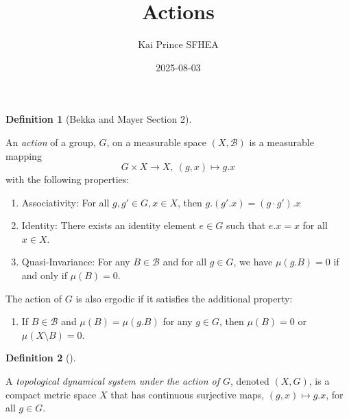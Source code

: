 \documentclass[
  british,
]{article}
\title{Actions}
\author{Kai Prince SFHEA}
\date{2025-08-03}
\providecommand{\tightlist}{%
  \setlength{\itemsep}{0pt}\setlength{\parskip}{0pt}}
\renewcommand*\contentsname{Table of contents}
\newcommand\contentsname{Table of contents}
\theoremstyle{definition}
\newtheorem{definition}{Definition}[section]
\theoremstyle{remark}
\newcommand{\Measure}{{\mu}}
\newcommand{\GroupAction}[2]{{#1}.{#2}}
\newcommand{\GroupIdentity}{{e}}
\newcommand{\Group}{{G}}
\newcommand{\GroupElement}{{g}}
\newcommand{\GroupOperation}[2]{{#1}\cdot{#2}}
\newcommand{\SigmaAlgebra}[1]{{\mathscr{#1}}}
\begin{document}
\maketitle

\renewcommand*\contentsname{Table of contents}
{
\hypersetup{linkcolor=}
\setcounter{tocdepth}{3}
\tableofcontents
}

\begin{definition}[Bekka and Mayer
 Section
2]\protect\hypertarget{def-action}{}\label{def-action}

An \emph{action} of a group, \(\Group\), on a measurable space
\((X,\SigmaAlgebra{B})\) is a measurable mapping
\[\Group\times X\rightarrow X,\ (\GroupElement,x)\mapsto \GroupAction{\GroupElement}{x} \]
with the following properties:

\begin{enumerate}
\def\labelenumi{\arabic{enumi}.}
\tightlist
\item
  Associativity: For all
  \(\GroupElement,\GroupElement'\in \Group,x\in X\), then
  \(\GroupAction{\GroupElement}{(\GroupAction{\GroupElement'}{x})}=\GroupAction{(\GroupOperation{\GroupElement}{\GroupElement'})}{x}\)
\item
  Identity: There exists an identity element \(\GroupIdentity\in\Group\)
  such that \(\GroupAction{\GroupIdentity}{x}=x\) for all \(x\in X\).
\item
  Quasi-Invariance: For any \(B\in\SigmaAlgebra{B}\) and for all
  \(\GroupElement\in\Group\), we have
  \(\Measure(\GroupAction{\GroupElement}{B})=0\) if and only if
  \(\Measure(B)=0\).
\end{enumerate}

The action of \(\Group\) is also ergodic if it satisfies the additional
property:

\begin{enumerate}
\def\labelenumi{\arabic{enumi}.}
\setcounter{enumi}{3}
\tightlist
\item
  If \(B\in\SigmaAlgebra{B}\) and
  \(\Measure(B)=\Measure(\GroupAction{\GroupElement}{B})\) for any
  \(\GroupElement\in\Group\), then \(\Measure(B)=0\) or
  \(\Measure(X\setminus B)=0\).
\end{enumerate}

\end{definition}

\begin{definition}[]\protect\hypertarget{def-topologicalDynamicalSystem}{}\label{def-topologicalDynamicalSystem}

A \emph{topological dynamical system under the action of \(\Group\)},
denoted \((X,\Group)\), is a compact metric space \(X\) that has
continuous surjective maps,
\((\GroupElement,x)\mapsto \GroupAction{\GroupElement}{x}\), for all
\(\GroupElement\in\Group\).

\end{definition}
\end{document}
